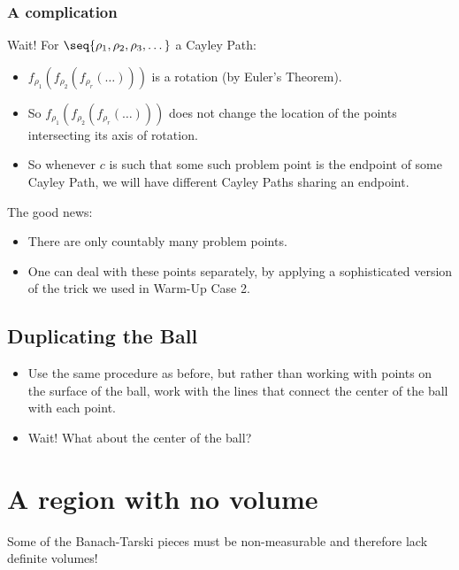 \documentclass[12pt]{extarticle}
\begin{document}
\subsubsection{A complication}

Wait! For \(\seq{\rho_1,\rho_2,\rho_3,\dots}\) a Cayley Path:
\begin{itemize}

\item \(f_{\rho_1}(f_{\rho_2}(f_{\rho_r}(\dots)))\) is a rotation (by Euler's Theorem).


\item So \(f_{\rho_1}(f_{\rho_2}(f_{\rho_r}(\dots)))\) does not change the location of the points intersecting its axis of rotation. 

\item So whenever \(c\) is such that some such problem point is the endpoint of some Cayley Path, we will have different Cayley Paths sharing an endpoint. 
\end{itemize}

The good news:

\begin{itemize}

\item There are only countably many problem points.


\item One can deal with these points separately, by applying a sophisticated version of the trick we used in Warm-Up Case 2.


\end{itemize}


\subsection{Duplicating the Ball}

\begin{itemize}

\item Use the same procedure as before, but rather than working with points on the surface of the ball, work with the lines that connect the center of the ball with each point.

\item Wait! What about the center of the ball?
\end{itemize}


\section{A region with no volume}

Some of the Banach-Tarski pieces must be non-measurable and therefore lack definite volumes!
\end{document}
